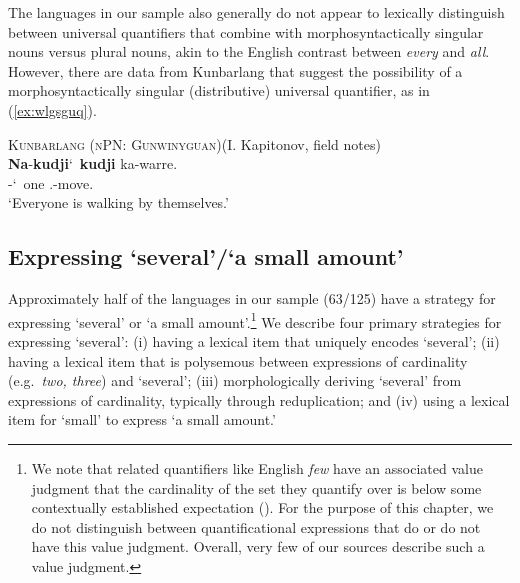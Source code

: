 \documentclass[12pt,egregdoesnotlikesansseriftitles]{scrartcl}
\newcommand{\ofy}{/125} %
\begin{document}
The languages in our sample also generally do not appear to lexically distinguish between universal quantifiers that  combine with morphosyntactically singular nouns versus plural nouns, akin to the 
English contrast between \textit{every} and \textit{all}. However, there are data from Kunbarlang that suggest the possibility of a morphosyntactically singular (distributive) universal quantifier, as in (\ref{ex:wlgsguq}).
\begin{exe}
  \ex\textsc{Kunbarlang (nPN: Gunwinyguan)}\hfill (I. Kapitonov, field notes)\\
  \gll \textbf{Na}-\textbf{kudji}\char`~\textbf{kudji} ka-warre.\\
  \Cli-\Rdp\char`~one \Tsg.\Nfut-move.\Np\\
  \glt `Everyone is walking by themselves.' \label{ex:wlgsguq} %
\end{exe}



\subsection{Expressing `several'/`a small amount'}

Approximately half of the languages in our sample (63\ofy) have a strategy for expressing `several' or `a small amount'.\footnote{We note that related quantifiers like English \textit{few} have an associated value judgment that the cardinality of the set they quantify over is below some contextually established expectation (\citealt{keenan17qu}). For the purpose of this chapter, we do not distinguish between quantificational expressions that do or do not have this value judgment. Overall, very few of our sources describe such a value judgment.} We describe four primary strategies for expressing `several': (i) having a lexical item that uniquely encodes `several'; (ii) having a lexical item that is polysemous between expressions of cardinality (e.g.\ \textit{two, three}) and `several'; (iii) morphologically deriving `several' from expressions of cardinality, typically through reduplication; and (iv) using a lexical item for `small' to express `a small amount.'
\end{document}
